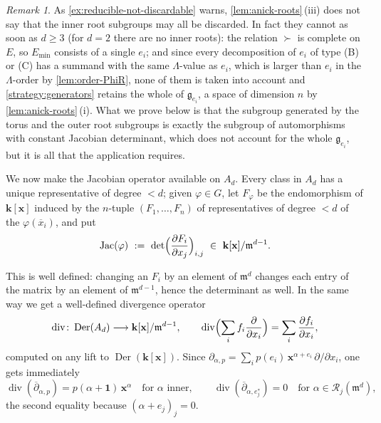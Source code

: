 \documentclass[11pt,letterpaper,reqno]{amsart}
\theoremstyle{remark}
\newtheorem{remark}[remark]{Remark}
\theoremstyle{definition}
\def\M{\mathfrak{m}}
\def\XX{\mathbf{x}}
\newcommand{\KK}[0]{\ensuremath{\mathbf{k}}}
\newcommand{\Der}[0]{\ensuremath{\operatorname{Der}}}
\newcommand{\R}{\mathcal R}
\newcommand{\jac}[0]{\ensuremath{\operatorname{Jac}}}
\newcommand{\divi}[0]{\ensuremath{\operatorname{div}}}
\begin{document}
\begin{remark}\label{rmk:anick-not-discardable}
As \cref{ex:reducible-not-discardable} warns, \cref{lem:anick-roots}\,\textup{(iii)} does
not say that the inner root subgroups may all be discarded. In fact they cannot as soon as $d\geq3$ (for $d=2$ there are no inner roots): the
relation $\succ$ is complete on $E$, so $E_{\mathrm{min}}$ consists
of a single $e_i$; and since every decomposition of $e_i$ of type \textup{(B)} or \textup{(C)} has a summand with the same $\Lambda$-value as $e_i$, which is larger than $e_i$ in the $\Lambda$-order by \cref{lem:order-PhiR}, none of them is taken into account and
\cref{strategy:generators} retains the whole of $\mathfrak g_{e_i}$, a space of dimension $n$
by \cref{lem:anick-roots}\,\textup{(i)}. What we prove below is that the subgroup generated by the torus and the
outer root subgroups is exactly the subgroup of automorphisms with constant Jacobian
determinant, which does not account for the whole $\mathfrak g_{e_i}$, but it is all that the application requires.
\end{remark}

\medskip

We now make the Jacobian operator available on $A_d$. Every class in $A_d$ has a unique
representative of degree $<d$; given $\varphi\in G$, let $F_\varphi$ be the endomorphism of $\KK[\XX]$ induced by the $n$-tuple $(F_1,\dots,F_n)$ of representatives of degree $<d$ of the $\varphi(\overline x_i)$, and put
$$
\jac(\varphi)\ :=\ \det\Bigl(\frac{\partial F_i}{\partial x_j}\Bigr)_{i,j}
\ \in\ \KK[\XX]/\M^{d-1}.
$$

This is well defined: changing an $F_i$ by an element of $\M^d$ changes each entry of the
matrix by an element of $\M^{d-1}$, hence the determinant as well. In the same way we get a
well-defined divergence operator
$$
\divi\colon \Der(A_d)\longrightarrow \KK[\XX]/\M^{d-1},\qquad
\divi\Bigl(\sum_i f_i\frac{\partial}{\partial x_i}\Bigr)=\sum_i\frac{\partial f_i}{\partial x_i},
$$
computed on any lift to $\Der(\KK[\XX])$. Since
$\partial_{\alpha,p}=\sum_i p(e_i)\,\XX^{\alpha+e_i}\,\partial/\partial x_i$, one gets immediately
\begin{equation}\label{eq:divergence}
\divi(\overline\partial_{\alpha,p})=p(\alpha+\mathbf 1)\,\XX^{\alpha}
\quad\text{for $\alpha$ inner},
\qquad
\divi(\overline\partial_{\alpha,e_j^*})=0\quad\text{for $\alpha\in\R_j(\M^d)$},
\end{equation}
the second equality because $(\alpha+e_j)_j=0$.
\end{document}
